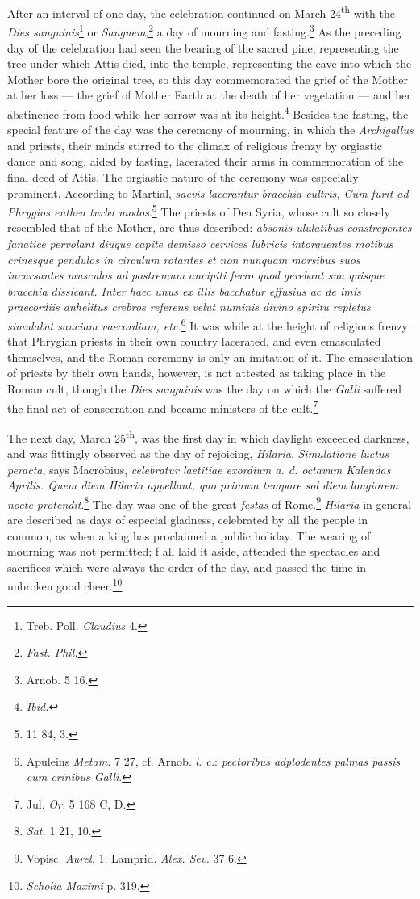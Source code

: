 \documentclass[a4paper, 11pt, oneside, polutonikogreek, english]{article}
\begin{document}
After an interval of one day, the celebration continued on March 24\textsuperscript{th} with the \emph{Dies sanguinis}\footnote{Treb. Poll. \emph{Claudius} 4.} or \emph{Sanguem},\footnote{\emph{Fast. Phil.}} a day of mourning and fasting.\footnote{Arnob. 5 16.} As the preceding day of the celebration had seen the bearing of the sacred pine, representing the tree under which Attis died, into the temple, representing the cave into which the Mother bore the original tree, so this day commemorated the grief of the Mother at her loss --- the grief of Mother Earth at the death of her vegetation --- and her abstinence from food while her sorrow was at its height.\footnote{\emph{Ibid.}} Besides the fasting, the special feature of the day was the ceremony of mourning, in which the \emph{Archigallus} and priests, their minds stirred to the climax of religious frenzy by orgiastic dance and song, aided by fasting, lacerated their arms in commemoration of the final deed of Attis. The orgiastic nature of the ceremony was especially prominent. According to Martial, \emph{saevis lacerantur bracchia cultris, Cum furit ad Phrygios enthea turba modos}.\footnote{11 84, 3.} The priests of Dea Syria, whose cult so closely resembled that of the Mother, are thus described: \emph{absonis ululatibus constrepentes fanatice pervolant diuque capite demisso cervices lubricis intorquentes motibus crinesque pendulos in circulum rotantes et non nunquam morsibus suos incursantes musculos ad postremum ancipiti ferro quod gerebant sua quisque bracchia dissicant. Inter haec unus ex illis bacchatur effusius ac de imis praecordiis anhelitus crebros referens velut numinis divino spiritu repletus simulabat sauciam vaecordiam, etc.}\footnote{Apuleins \emph{Metam.} 7 27, cf. Arnob. \emph{l. c.}: \emph{pectoribus adplodentes palmas passis cum crinibus Galli}.} It was while at the height of religious frenzy that Phrygian priests in their own country lacerated, and even emasculated themselves, and the Roman ceremony is only an imitation of it. The emasculation of priests by their own hands, however, is not attested as taking place in the Roman cult, though the \emph{Dies sanguinis} was the day on which the \emph{Galli} suffered the final act of consecration and became ministers of the cult.\footnote{Jul. \emph{Or.} 5 168 C, D.}

The next day, March 25\textsuperscript{th}, was the first day in which daylight exceeded darkness, and was fittingly observed as the day of rejoicing, \emph{Hilaria}. \emph{Simulatione luctus peracta}, says Macrobius, \emph{celebratur laetitiae exordium a. d. octavum Kalendas Aprilis. Quem diem Hilaria appellant, quo primum tempore sol diem longiorem nocte protendit}.\footnote{\emph{Sat.} 1 21, 10.} The day was one of the great \emph{festas} of Rome.\footnote{Vopisc. \emph{Aurel.} 1; Lamprid. \emph{Alex. Sev.} 37 6.} \emph{Hilaria} in general are described as days of especial gladness, celebrated by all the people in common, as when a king has proclaimed a public holiday. The wearing of mourning was not permitted; f all laid it aside, attended the spectacles and sacrifices which were always the order of the day, and passed the time in unbroken good cheer.\footnote{\emph{Scholia Maximi} p. 319.}
\end{document}
